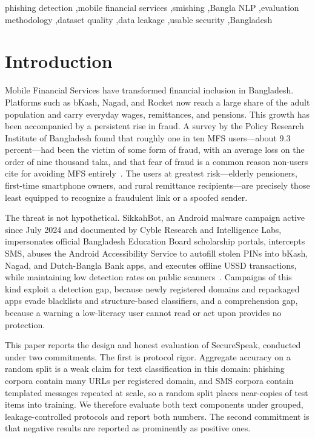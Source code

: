 \documentclass[preprint,12pt,number]{elsarticle}
\begin{document}
\begin{frontmatter}
\begin{keyword}
phishing detection \sep mobile financial services \sep smishing \sep Bangla NLP \sep evaluation methodology \sep dataset quality \sep data leakage \sep usable security \sep Bangladesh
\end{keyword}

\end{frontmatter}

\section{Introduction}
Mobile Financial Services have transformed financial inclusion in Bangladesh. Platforms such as bKash, Nagad, and Rocket now reach a large share of the adult population and carry everyday wages, remittances, and pensions. This growth has been accompanied by a persistent rise in fraud. A survey by the Policy Research Institute of Bangladesh found that roughly one in ten MFS users---about 9.3 percent---had been the victim of some form of fraud, with an average loss on the order of nine thousand taka, and that fear of fraud is a common reason non-users cite for avoiding MFS entirely~\cite{pri2022}. The users at greatest risk---elderly pensioners, first-time smartphone owners, and rural remittance recipients---are precisely those least equipped to recognize a fraudulent link or a spoofed sender.

The threat is not hypothetical. SikkahBot, an Android malware campaign active since July 2024 and documented by Cyble Research and Intelligence Labs, impersonates official Bangladesh Education Board scholarship portals, intercepts SMS, abuses the Android Accessibility Service to autofill stolen PINs into bKash, Nagad, and Dutch-Bangla Bank apps, and executes offline USSD transactions, while maintaining low detection rates on public scanners~\cite{sikkahbot}. Campaigns of this kind exploit a detection gap, because newly registered domains and repackaged apps evade blacklists and structure-based classifiers, and a comprehension gap, because a warning a low-literacy user cannot read or act upon provides no protection.

This paper reports the design and honest evaluation of SecureSpeak, conducted under two commitments. The first is protocol rigor. Aggregate accuracy on a random split is a weak claim for text classification in this domain: phishing corpora contain many URLs per registered domain, and SMS corpora contain templated messages repeated at scale, so a random split places near-copies of test items into training. We therefore evaluate both text components under grouped, leakage-controlled protocols and report both numbers. The second commitment is that negative results are reported as prominently as positive ones.
\end{document}

